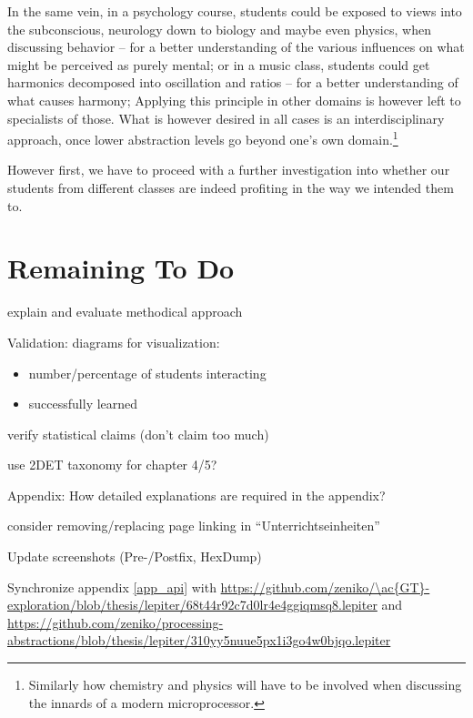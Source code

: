 In the same vein, in a psychology course, students could be exposed to views into the subconscious, neurology down to biology and maybe even physics, when discussing behavior -- for a better understanding of the various influences on what might be perceived as purely mental; or in a music class, students could get harmonics decomposed into oscillation and ratios -- for a better understanding of what causes harmony; \etc Applying this principle in other domains is however left to specialists of those. What is however desired in all cases is an interdisciplinary approach, once lower abstraction levels go beyond one's own domain.\footnote{Similarly how chemistry and physics will have to be involved when discussing the innards of a modern microprocessor.}

However first, we have to proceed with a further investigation into whether our students from different classes are indeed profiting in the way we intended them to.


\section*{Remaining To Do}

\begin{todo}
\item explain and evaluate methodical approach
\item Validation: diagrams for visualization:
\begin{itemize}
\item number/percentage of students interacting
\item successfully learned
\end{itemize}
\item verify statistical claims (don't claim too much)
\item use 2DET taxonomy for chapter 4/5? \cite{Sor13}
\item Appendix: How detailed explanations are required in the appendix?
\item consider removing/replacing page linking in ``Unterrichtseinheiten''
\item Update screenshots (Pre-/Postfix, HexDump)
\item Synchronize appendix \ref{app_api} with \url{https://github.com/zeniko/\ac{GT}-exploration/blob/thesis/lepiter/68t44r92c7d0lr4e4ggiqmsq8.lepiter} and \url{https://github.com/zeniko/processing-abstractions/blob/thesis/lepiter/310yy5nuue5px1i3go4w0bjqo.lepiter}
\end{todo}
